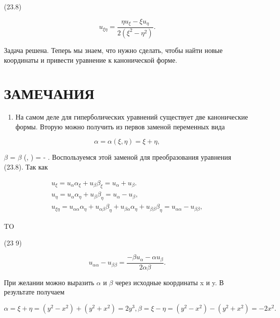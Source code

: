 \documentclass[
  ukrainian,
]{article}
\providecommand{\tightlist}{%
  \setlength{\itemsep}{0pt}\setlength{\parskip}{0pt}}
\begin{document}
(23.8)

\[
u_{\xi\eta} = \frac{\eta u_{\xi} - \xi u_{\eta}}{2(\xi^2 - \eta^2)}.
\]

Задача решена. Теперь мы знаем, что нужно сделать, чтобы найти новые
координаты и привести уравнение к канонической форме.

\section{ЗАМЕЧАНИЯ}\label{ux437ux430ux43cux435ux447ux430ux43dux438ux44f-9}

\begin{enumerate}
\def\labelenumi{\arabic{enumi}.}
\tightlist
\item
  На самом деле для гиперболических уравнений существует две
  канонические формы. Вторую можно получить из первов заменой переменных
  вида
\end{enumerate}

\[
\alpha = \alpha (\xi, \eta) = \xi + \eta,
\]

\(\beta\) = \(\beta\) (\xi, \eta) = \xi - \eta. Воспользуемся этой
заменой для преобразования уравнения (23.8). Так как

\[
\begin{array}{l} u_{\xi} = u_{\alpha}\alpha_{\xi} + u_{\beta}\beta_{\xi} = u_{\alpha} + u_{\beta}. \\ u_{\eta} = u_{\alpha}\alpha_{\eta} + u_{\beta}\beta_{\eta} = u_{\alpha} - u_{\beta}, \\ u_{\xi\eta} = u_{\alpha\alpha}\alpha_{\eta} + u_{\alpha\beta}\beta_{\eta} + u_{\beta\alpha}\alpha_{\eta} + u_{\beta\beta}\beta_{\eta} = u_{\alpha\alpha} - u_{\beta\beta}, \end{array}
\]

TO

(23 9)

\[
u_{\alpha\alpha} - u_{\beta\beta} = \frac{-\beta u_{\alpha} - \alpha u_{\beta}}{2\alpha\beta}.
\]

При желании можно выразить \(\alpha\) и \(\beta\) через исходные
координаты x и y. В результате получаем

\[
\alpha = \xi + \eta = (y^2 - x^2) + (y^2 + x^2) = 2y^3,
\beta = \xi - \eta = (y^2 - x^2) - (y^2 + x^2) = -2x^2.
\]
\end{document}
